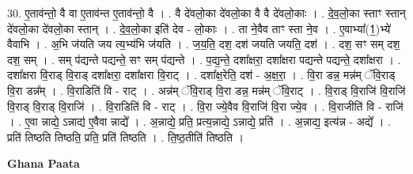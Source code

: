 \documentclass[17pt]{extarticle}
\begin{document}
30. ए॒ताव॑न्तो॒ वै वा ए॒ताव॑न्त ए॒ताव॑न्तो॒ वै । . वै दे॑वलो॒का दे॑वलो॒का वै वै दे॑वलो॒काः । . दे॒व॒लो॒का स्ताꣳ स्तान् दे॑वलो॒का दे॑वलो॒का स्तान् । . दे॒व॒लो॒का इति॑ देव - लो॒काः । . ता ने॒वैव ताꣳ स्ता ने॒व । . ए॒वाभ्या᳚(1॒)भ्ये॑ वैवाभि । . अ॒भि ज॑यति जय त्य॒भ्य॑भि ज॑यति । . ज॒य॒ति॒ दश॒ दश॑ जयति जयति॒ दश॑ । . दश॒ सꣳ सम् दश॒ दश॒ सम् । . सम् प॑द्यन्ते पद्यन्ते॒ सꣳ सम् प॑द्यन्ते । . प॒द्य॒न्ते॒ दशा᳚क्षरा॒ दशा᳚क्षरा पद्यन्ते पद्यन्ते॒ दशा᳚क्षरा । . दशा᳚क्षरा वि॒राड् वि॒राड् दशा᳚क्षरा॒ दशा᳚क्षरा वि॒राट् । . दशा᳚क्ष॒रेति॒ दश॑ - अ॒क्ष॒रा॒ । . वि॒रा डन्न॒ मन्न॑म् ॅवि॒राड् वि॒रा डन्न᳚म् । . वि॒राडिति॑ वि - राट् । . अन्न॑म् ॅवि॒राड् वि॒रा डन्न॒ मन्न॑म् ॅवि॒राट् । . वि॒राड् वि॒राजि॑ वि॒राजि॑ वि॒राड् वि॒राड् वि॒राजि॑ । . वि॒राडिति॑ वि - राट् । . वि॒रा ज्ये॒वैव वि॒राजि॑ वि॒रा ज्ये॒व । . वि॒राजीति॑ वि - राजि॑ । . ए॒वा न्नाद्ये॒ ऽन्नाद्य॑ ए॒वैवा न्नाद्ये᳚ । . अ॒न्नाद्ये॒ प्रति॒ प्रत्य॒न्नाद्ये॒ ऽन्नाद्ये॒ प्रति॑ । . अ॒न्नाद्य॒ इत्य॑न्न - अद्ये᳚ । . प्रति॑ तिष्ठति तिष्ठति॒ प्रति॒ प्रति॑ तिष्ठति । . ति॒ष्ठ॒तीति॑ तिष्ठति । \newline

\textbf{Ghana Paata } \newline
\end{document}
